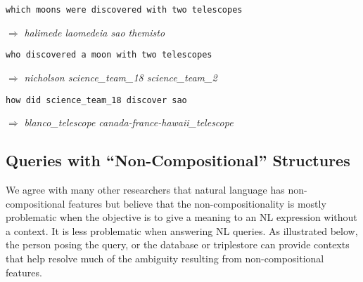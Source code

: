 \documentclass[../main.tex]{subfiles}
\begin{document}
\begin{refsection}


\texttt{which moons were discovered with two telescopes}

$\Rightarrow$ \textit{halimede laomedeia sao themisto}


\texttt{who discovered a moon with two telescopes}

$\Rightarrow$ \textit{nicholson science\_team\_18 science\_team\_2}





\noindent \texttt{how did science\_team\_18 discover sao}

$\Rightarrow$ \textit{blanco\_telescope canada-france-hawaii\_telescope}




\subsection{Queries with ``Non-Compositional'' Structures}
\label{webist2019conf:noncompositional}

We agree with many other researchers that natural language has non-compositional features but believe that the non-compositionality is mostly problematic when the objective is to give a meaning to an NL expression without a context. It is less problematic when answering NL queries. As illustrated below, the person posing the query, or the database or triplestore can provide contexts that help resolve much of the ambiguity resulting from non-compositional features.


\end{refsection}
\end{document}
